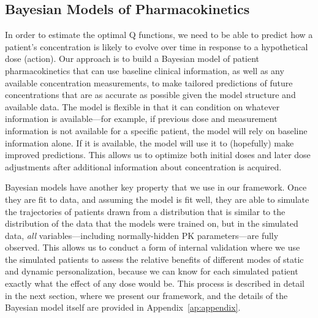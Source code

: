 \subsection{Bayesian Models of Pharmacokinetics}

In order to estimate the optimal Q functions, we need to be able to predict how a patient's concentration is likely to evolve over time in response to a hypothetical dose (action).  Our approach is to build a Bayesian model of patient pharmacokinetics that can use baseline clinical information, as well as any available concentration measurements, to make tailored predictions of future concentrations that are as accurate as possible given the model structure and available data. The model is flexible in that it can condition on whatever information is available---for example, if previous dose and measurement information is not available for a specific patient, the model will rely on baseline information alone. If it is available, the model will use it to (hopefully) make improved predictions. This allows us to optimize both initial doses and later dose adjustments after additional information about concentration is acquired.

Bayesian models have another key property that we use in our framework. Once they are fit to data, and assuming the model is fit well, they are able to simulate the trajectories of patients drawn from a distribution that is similar to the distribution of the data that the models were trained on, but in the simulated data, \textit{all} variables---including normally-hidden PK parameters---are fully observed. This allows us to conduct a form of internal validation where we use the simulated patients to assess the relative benefits of different modes of static and dynamic personalization, because we can know for each simulated patient exactly what the effect of any dose would be. This process is described in detail in the next section, where we present our framework, and the details of the Bayesian model itself are provided in Appendix~\ref{ap:appendix}.
